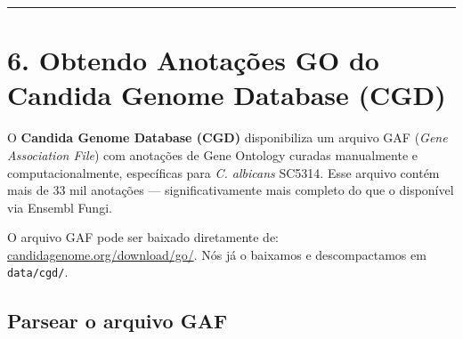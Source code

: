 \documentclass[
  letterpaper,
  DIV=11,
  numbers=noendperiod]{scrreprt}
\begin{document}
\begin{center}\rule{0.5\linewidth}{0.5pt}\end{center}

\section{6. Obtendo Anotações GO do Candida Genome Database
(CGD)}\label{obtendo-anotauxe7uxf5es-go-do-candida-genome-database-cgd}

O \textbf{Candida Genome Database (CGD)} disponibiliza um arquivo GAF
(\emph{Gene Association File}) com anotações de Gene Ontology curadas
manualmente e computacionalmente, específicas para \emph{C. albicans}
SC5314. Esse arquivo contém mais de 33 mil anotações ---
significativamente mais completo do que o disponível via Ensembl Fungi.

\begin{tcolorbox}[enhanced jigsaw, arc=.35mm, colframe=quarto-callout-note-color-frame, breakable, bottomrule=.15mm, colback=white, left=2mm, titlerule=0mm, opacityback=0, title=\textcolor{quarto-callout-note-color}{\faInfo}\hspace{0.5em}{Ponto Importante}, leftrule=.75mm, colbacktitle=quarto-callout-note-color!10!white, bottomtitle=1mm, toprule=.15mm, toptitle=1mm, rightrule=.15mm, opacitybacktitle=0.6, coltitle=black]

O arquivo GAF pode ser baixado diretamente de:
\href{http://www.candidagenome.org/download/go/}{candidagenome.org/download/go/}.
Nós já o baixamos e descompactamos em \texttt{data/cgd/}.

\end{tcolorbox}

\subsection{Parsear o arquivo GAF}\label{parsear-o-arquivo-gaf}
\end{document}
